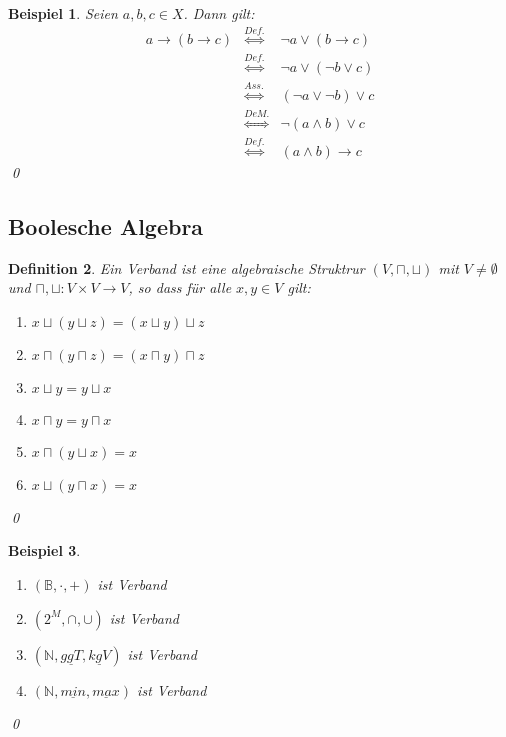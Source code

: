 \documentclass[ngerman]{scrartcl}
\theoremstyle{custom}
\newtheorem{mdef}{Definition} \numberwithin{mdef}{subsection}
\newtheorem{mex}[mdef]{Beispiel}
\newcommand{\0}{\mathbf{0}}
\newcommand{\1}{\mathbf{L}}
\begin{document}
\begin{mex}
Seien $a,b,c \in X$. Dann gilt:
\begin{eqnarray*}
a \rightarrow (b \rightarrow c) &\stackrel{Def.}{\Leftrightarrow}& \neg a \vee (b
\rightarrow c) \\
&\stackrel{Def.}{\Leftrightarrow}& \neg a \vee (\neg b \vee c)\\
&\stackrel{Ass.}{\Leftrightarrow}& (\neg a \vee \neg b) \vee c \\
&\stackrel{De M.}{\Leftrightarrow}& \neg (a \wedge b) \vee c \\
&\stackrel{Def.}{\Leftrightarrow}& (a \wedge b) \rightarrow c
\end{eqnarray*}
\qed
\end{mex}

\subsection{Boolesche Algebra}
\begin{mdef} Ein \emph{Verband} ist eine algebraische Struktrur $(V,
  \sqcap, \sqcup)$ mit $V \not = \emptyset$ und $\sqcap, \sqcup: V \times
  V \rightarrow V$, so dass f\"ur alle $x, y \in V$ gilt:
\begin{enumerate}
\item $x \sqcup (y \sqcup z) = (x \sqcup y) \sqcup z$
\item $x \sqcap (y \sqcap z) = (x \sqcap y) \sqcap z$
\item $x \sqcup y = y \sqcup x$
\item $x \sqcap y = y \sqcap x$
\item $x \sqcap (y \sqcup x) = x$
\item $x \sqcup (y \sqcap x) = x$
\end{enumerate}
\qed
\end{mdef}

\begin{mex}

\begin{enumerate}

\item $(\mathds{B}, \cdot, +)$ ist Verband
\item $(2^M, \cap, \cup)$ ist Verband
\item $(\mathds{N}, \underline{ggT}, \underline{kgV})$ ist Verband
\item $(\mathds{N}, \underline{min}, \underline{max})$ ist Verband
\end{enumerate}
\qed
\end{mex}
\end{document}
